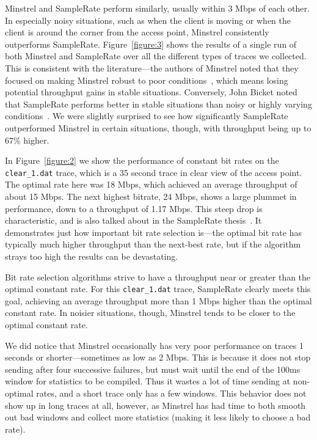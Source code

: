 \documentclass[letterpaper,twocolumn,10pt]{article}
\begin{document}
Minstrel and SampleRate perform similarly, usually within 3 Mbps of each other. In especially noisy situations, such as when the client is moving or when the client is around the corner from the access point, Minstrel consistently outperforms SampleRate. Figure~\ref{figure:3} shows the results of a single run of both Minstrel and SampleRate over all the different types of traces we collected. This is consistent with the literature---the authors of Minstrel noted that they focused on making Minstrel robust to poor conditions~\cite{minstrel}, which means losing potential throughput gains in stable situations. Conversely, John Bicket noted that SampleRate performs better in stable situations than noisy or highly varying conditions~\cite{samplerate}. We were slightly surprised to see how significantly SampleRate outperformed Minstrel in certain situations, though, with throughput being up to 67\% higher. 

In Figure~\ref{figure:2} we show the performance of constant bit rates on the \texttt{clear\_1.dat} trace, which is a 35 second trace in clear view of the access point. The optimal rate here was 18 Mbps, which achieved an average throughput of about 15 Mbps. The next highest bitrate, 24 Mbps, shows a large plummet in performance, down to a throughput of 1.17 Mbps. This steep drop is characteristic, and is also talked about in the SampleRate thesis~\cite{samplerate}. It demonstrates just how important bit rate selection is---the optimal bit rate has typically much higher throughput than the next-best rate, but if the algorithm strays too high the results can be devastating. 

Bit rate selection algorithms strive to have a throughput near or greater than the optimal constant rate. For this \texttt{clear\_1.dat} trace, SampleRate clearly meets this goal, achieving an average throughput more than 1 Mbps higher than the optimal constant rate. In noisier situations, though, Minstrel tends to be closer to the optimal constant rate. 

We did notice that Minstrel occasionally has very poor performance on traces 1 seconds or shorter---sometimes as low as 2 Mbps. This is because it does not stop sending after four successive failures, but must wait until the end of the 100ms window for statistics to be compiled. Thus it wastes a lot of time sending at non-optimal rates, and a short trace only has a few windows. This behavior does not show up in long traces at all, however, as Minstrel has had time to both smooth out bad windows and collect more statistics (making it less likely to choose a bad rate).
\end{document}
